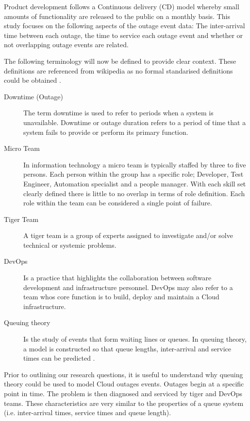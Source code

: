 \documentclass[5p]{elsarticle}
\begin{document}
Product development follows a Continuous delivery (CD) model whereby small amounts of functionality are released to the public on a monthly basis. This study focuses on the following aspects of the outage event data: The inter-arrival time between each outage, the time to service each outage event and whether or not overlapping outage events are related.

The following terminology will now be defined to provide clear context. These definitions are referenced from wikipedia as no formal standarised definitions could be obtained \cite{wikidef}.

\begin{description}
 \item [Downtime (Outage)] The term downtime is used to refer to periods when a system is unavailable. Downtime or outage duration refers to a period of time that a system fails to provide or perform its primary function. 
 \item  [Micro Team] In information technology a micro team is typically staffed by three to five persons. Each person within the group has a specific role; Developer, Test Engineer, Automation specialist and a people manager. With each skill set clearly defined there is little to no overlap in terms of role definition. Each role within the team can be considered a single point of failure.
  \item [Tiger Team] A tiger team is a group of experts assigned to investigate and/or solve technical or systemic problems. 
 \item [DevOps] Is a practice that highlights the collaboration between software development and infrastructure personnel. DevOps may also refer to a team whos core function is to build, deploy and maintain a Cloud infrastructure. 
 \item [Queuing theory] Is the study of events that form waiting lines or queues. In queuing theory, a model is constructed so that queue lengths, inter-arrival and service times can be predicted \cite{sundarapandian2009probability}.
\end{description}

Prior to outlining our research questions, it is useful to understand why queuing theory could be used to model Cloud outages events. Outages begin at a specific point in time. The problem is then diagnosed and serviced by tiger and DevOps teams. These characteristics are very similar to the properties of a queue system (i.e. inter-arrival times, service times and queue length). 
\end{document}
